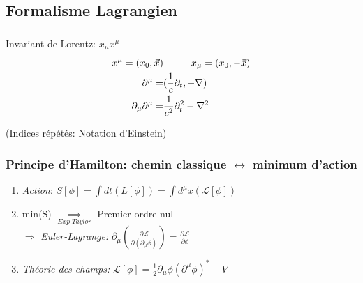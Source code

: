 \documentclass[handout]{beamer}
\begin{document}
\subsection{Formalisme Lagrangien}
\begin{frame}

\frametitle{}
\begin{block}{}
Invariant de Lorentz: $x_\mu x^\mu$
\begin{align*}
x^\mu = (x_0,\vec{x}) &\hspace{1 cm} x_\mu = (x_0,-\vec{x})\\
\partial^\mu =& (\frac{1}{c} \partial_t, -\nabla) \\
\partial_\mu \partial^\mu =& \frac{1}{c^2} \partial_t^2- \nabla^2 
\end{align*}

\end{block}
(Indices répétés: Notation d'Einstein)

\end{frame}

\begin{frame}\frametitle{Principe d'Hamilton: chemin classique $\leftrightarrow$ minimum d'action}
\begin{enumerate}

\item \textit{Action}: $S[\phi] = \int{dt (L[\phi])}  =  \int{d^{\mu}x (\mathcal{L}[\phi])}$\\[0.5 cm]
\item min(S) $\underset{Exp. Taylor}{\implies}$ Premier ordre nul \\
$\Rightarrow$ \textit{Euler-Lagrange:} $\partial_\mu \left(\frac{\partial\mathcal{L}}{\partial(\partial_\mu\phi)}\right) = \frac{\partial\mathcal{L}}{\partial\phi}$\\[0.5 cm]
\item  \textit{Théorie des champs:} $\mathcal{L}[\phi] = \frac{1}{2} \partial_\mu \phi (\partial^\mu \phi)^* -V$

\end{enumerate}
\end{frame}
\end{document}
